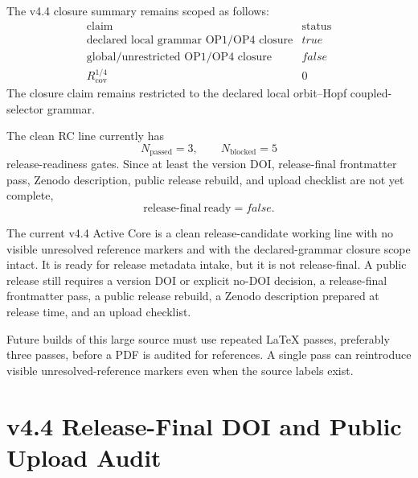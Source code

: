\begin{proposition}
The v4.4 closure summary remains scoped as follows:
\[
\begin{array}{c|c}
\text{claim} & \text{status}\\
\hline
\text{declared local grammar OP1/OP4 closure} & true\\
\text{global/unrestricted OP1/OP4 closure} & false\\
R_{\mathrm{cov}}^{1/4} & 0
\end{array}
\]
The closure claim remains restricted to the declared local orbit--Hopf
coupled-selector grammar.
\end{proposition}

\begin{proposition}
The clean RC line currently has
\[
    N_{\mathrm{passed}}=3,
    \qquad
    N_{\mathrm{blocked}}=5
\]
release-readiness gates.  Since at least the version DOI, release-final
frontmatter pass, Zenodo description, public release rebuild, and upload
checklist are not yet complete,
\[
    \mathrm{release\text{-}final\ ready}=false.
\]
\end{proposition}

\begin{theorem}
The current v4.4 Active Core is a clean release-candidate working line with no
visible unresolved reference markers and with the declared-grammar closure
scope intact.  It is ready for release metadata intake, but it is not
release-final.  A public release still requires a version DOI or explicit
no-DOI decision, a release-final frontmatter pass, a public release rebuild, a
Zenodo description prepared at release time, and an upload checklist.
\end{theorem}

\begin{remark}
Future builds of this large source must use repeated LaTeX passes, preferably
three passes, before a PDF is audited for references.  A single pass can
reintroduce visible unresolved-reference markers even when the source labels
exist.
\end{remark}


\clearpage
\section{v4.4 Release-Final DOI and Public Upload Audit}
\label{sec:v44-release-final-doi-public-upload-audit}

